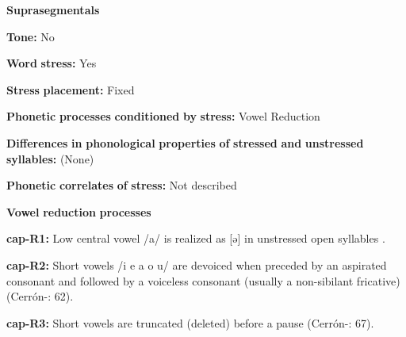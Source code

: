 \documentclass[output=paper]{langsci/langscibook}
\begin{document}
\begin{styleBody}
\textbf{Suprasegmentals}
\end{styleBody}

\begin{styleBody}
\textbf{Tone:} No
\end{styleBody}

\begin{styleBody}
\textbf{Word} \textbf{stress:} Yes
\end{styleBody}

\begin{styleBody}
\textbf{Stress} \textbf{placement:} Fixed
\end{styleBody}

\begin{styleBody}
\textbf{Phonetic} \textbf{processes} \textbf{conditioned} \textbf{by} \textbf{stress:} Vowel Reduction
\end{styleBody}

\begin{styleBody}
\textbf{Differences} \textbf{in} \textbf{phonological} \textbf{properties} \textbf{of} \textbf{stressed} \textbf{and} \textbf{unstressed} \textbf{syllables:} (None)
\end{styleBody}

\begin{styleBody}
\textbf{Phonetic} \textbf{correlates} \textbf{of} \textbf{stress:} Not described
\end{styleBody}

\begin{styleBody}
\textbf{Vowel} \textbf{reduction} \textbf{processes}
\end{styleBody}

\begin{styleBody}
\textbf{cap-R1:} Low central vowel /a/ is realized as [ə] in unstressed open syllables \citep[301]{Olson1967}.
\end{styleBody}

\begin{styleBody}
\textbf{cap-R2:} Short vowels /i e a o u/ are devoiced when preceded by an aspirated consonant and followed by a voiceless consonant (usually a non-sibilant fricative) (Cerrón-\citealt{Palomino2006}: 62).
\end{styleBody}

\begin{styleBody}
\textbf{cap-R3:} Short vowels are truncated (deleted) before a pause (Cerrón-\citealt{Palomino2006}: 67).
\end{styleBody}
\end{document}

